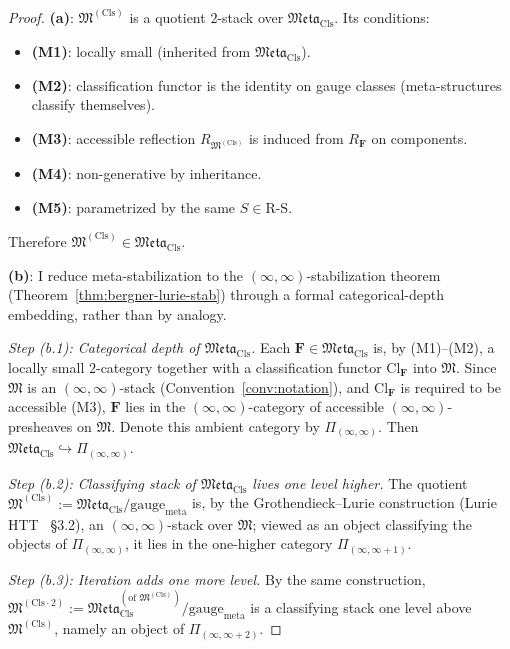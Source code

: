 \documentclass[11pt]{article}
\theoremstyle{plain}
\theoremstyle{definition}
\newcommand{\RS}{\mathrm{R\text{-}S}}
\newcommand{\fM}{\mathfrak{M}}
\newcommand{\Meta}{\mathfrak{Meta}}
\newcommand{\Cl}{\mathrm{Cl}}
\begin{document}
\begin{proof}

\textbf{(a)}: $\fM^{(\mathrm{Cls})}$ is a quotient $2$-stack over $\Meta_{\mathrm{Cls}}$. Its conditions:
\begin{itemize}
\item \textbf{(M1)}: locally small (inherited from $\Meta_{\mathrm{Cls}}$).
\item \textbf{(M2)}: classification functor is the identity on gauge classes (meta-structures classify themselves).
\item \textbf{(M3)}: accessible reflection $R_{\fM^{(\mathrm{Cls})}}$ is induced from $R_{\mathbf{F}}$ on components.
\item \textbf{(M4)}: non-generative by inheritance.
\item \textbf{(M5)}: parametrized by the same $S \in \RS$.
\end{itemize}
Therefore $\fM^{(\mathrm{Cls})} \in \Meta_{\mathrm{Cls}}$.

\textbf{(b)}: I reduce meta-stabilization to the $(\infty, \infty)$-stabilization theorem (Theorem~\ref{thm:bergner-lurie-stab}) through a formal categorical-depth embedding, rather than by analogy.

\emph{Step (b.1): Categorical depth of $\Meta_{\mathrm{Cls}}$.} Each $\mathbf{F} \in \Meta_{\mathrm{Cls}}$ is, by (M1)--(M2), a locally small $2$-category together with a classification functor $\Cl_{\mathbf{F}}$ into $\fM$. Since $\fM$ is an $(\infty, \infty)$-stack (Convention~\ref{conv:notation}), and $\Cl_{\mathbf{F}}$ is required to be accessible (M3), $\mathbf{F}$ lies in the $(\infty, \infty)$-category of accessible $(\infty, \infty)$-presheaves on $\fM$. Denote this ambient category by $\Pi_{(\infty, \infty)}$. Then $\Meta_{\mathrm{Cls}} \hookrightarrow \Pi_{(\infty, \infty)}$.

\emph{Step (b.2): Classifying stack of $\Meta_{\mathrm{Cls}}$ lives one level higher.} The quotient $\fM^{(\mathrm{Cls})} := \Meta_{\mathrm{Cls}} / \mathrm{gauge}_{\mathrm{meta}}$ is, by the Grothendieck--Lurie construction (Lurie HTT~\cite{LurieHTT} \S 3.2), an $(\infty, \infty)$-stack over $\fM$; viewed as an object classifying the objects of $\Pi_{(\infty, \infty)}$, it lies in the one-higher category $\Pi_{(\infty, \infty + 1)}$.

\emph{Step (b.3): Iteration adds one more level.} By the same construction, $\fM^{(\mathrm{Cls}\cdot 2)} := \Meta_{\mathrm{Cls}}^{(\text{of } \fM^{(\mathrm{Cls})})} / \mathrm{gauge}_{\mathrm{meta}}$ is a classifying stack one level above $\fM^{(\mathrm{Cls})}$, namely an object of $\Pi_{(\infty, \infty + 2)}$.


\end{proof}
\end{document}
